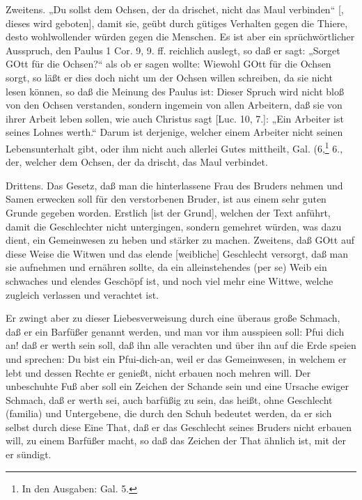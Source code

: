 Zweitens. „Du sollst dem Ochsen, der da drischet, nicht das Maul verbinden“ [, dieses wird geboten], damit sie, geübt durch gütiges Verhalten gegen die Thiere, desto wohlwollender würden gegen die Menschen. Es ist aber ein sprüchwörtlicher Ausspruch, den Paulus 1 Cor. 9, 9. ff. reichlich auslegt, so daß er sagt: „Sorget GOtt für die Ochsen?“ als ob er sagen wollte: Wiewohl GOtt für die Ochsen sorgt, so läßt er dies doch nicht um der Ochsen willen schreiben, da sie nicht lesen können, so daß die Meinung des Paulus ist: Dieser Spruch wird nicht bloß von den Ochsen verstanden, sondern ingemein von allen Arbeitern, daß sie von ihrer Arbeit leben sollen, wie auch Christus sagt [Luc. 10, 7.]: „Ein Arbeiter ist seines Lohnes werth.“ Darum ist derjenige, welcher einem Arbeiter nicht seinen Lebensunterhalt gibt, oder ihm nicht auch allerlei Gutes mittheilt, Gal. (6,\footnote{In den Ausgaben: Gal. 5.} 6., der, welcher dem Ochsen, der da drischt, das Maul verbindet.

Drittens. Das Gesetz, daß man die hinterlassene Frau des Bruders nehmen und Samen erwecken soll für den verstorbenen Bruder, ist aus einem sehr guten Grunde gegeben worden. Erstlich [ist der Grund], welchen der Text anführt, damit die Geschlechter nicht untergingen, sondern gemehret würden, was dazu dient, ein Gemeinwesen zu heben und stärker zu machen. Zweitens, daß GOtt auf diese Weise die Witwen und das elende [weibliche] Geschlecht versorgt, daß man sie aufnehmen und ernähren sollte, da ein alleinstehendes (per se) Weib ein schwaches und elendes Geschöpf ist, und noch viel mehr eine Wittwe, welche zugleich verlassen und verachtet ist.

Er zwingt aber zu dieser Liebesverweisung durch eine überaus große Schmach, daß er ein Barfüßer genannt werden, und man vor ihm ausspieen soll: Pfui dich an! daß er werth sein soll, daß ihn alle verachten und über ihn auf die Erde speien und sprechen: Du bist ein Pfui-dich-an, weil er das Gemeinwesen, in welchem er lebt und dessen Rechte er genießt, nicht erbauen noch mehren will. Der unbeschuhte Fuß aber soll ein Zeichen der Schande sein und eine Ursache ewiger Schmach, daß er werth sei, auch barfüßig zu sein, das heißt, ohne Geschlecht (familia) und Untergebene, die durch den Schuh bedeutet werden, da er sich selbst durch diese Eine That, daß er das Geschlecht seines Bruders nicht erbauen will, zu einem Barfüßer macht, so daß das Zeichen der That ähnlich ist, mit der er sündigt.

